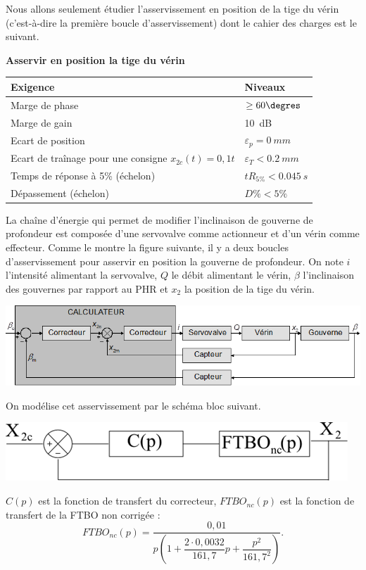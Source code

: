 \documentclass[10pt,fleqn]{article} %
\begin{document}
\begin{multicols}{2}
Nous allons seulement étudier l’asservissement en position de la tige du vérin (c’est-à-dire la première boucle d’asservissement) dont le cahier des charges est le suivant.

\begin{center}
\textbf{Asservir en position la tige du vérin }
\begin{tabular}{|p{.45\linewidth}|p{.45\linewidth}|}
\hline
 Exigence	& Niveaux \\ \hline\hline
 Marge de phase	 & $\geq 60\degres $\\ \hline
 Marge de gain	 & \SI{10}{dB} \\ \hline
 Ecart de position&	$\varepsilon_p=\SI{0}{mm}$\\ \hline
 Ecart de traînage pour une consigne $x_{2c} (t)=0,1 t $ & $\varepsilon_T<\SI{0.2}{mm}$\\ \hline
 Temps de réponse à 5\% (échelon)& $tR_{5\%}< \SI{0.045}{s}$ \\ \hline
 Dépassement (échelon)	& $D\%< 5\%$\\ \hline
\end{tabular}
\end{center}

La chaîne d’énergie qui permet de modifier l’inclinaison de gouverne de profondeur est composée d’une servovalve comme actionneur et d’un vérin comme effecteur. Comme le montre la figure suivante, il y a deux boucles d’asservissement pour asservir en position la gouverne de profondeur. On note $i$ l'intensité alimentant la servovalve, $Q$ le débit alimentant le vérin, $\beta$ l'inclinaison des gouvernes par rapport au PHR et $x_2$ la position de la tige du vérin.
 



\begin{center}
\includegraphics[width=\linewidth]{images/fig_03}
\end{center}


On modélise cet asservissement par le schéma bloc suivant.
\begin{center}
\includegraphics[width=\linewidth]{images/fig_04}
\end{center}
$C(p)$ est la fonction de transfert du correcteur, $FTBO_{nc}(p)$ est la fonction de transfert de la FTBO non corrigée : 
$$
FTBO_{nc}(p)=\dfrac{0,01}{p\left(1+\dfrac{2\cdot 0,0032}{161,7}p + \dfrac{p^2}{161,7^2} \right)}.
$$


\end{multicols}
\end{document}

